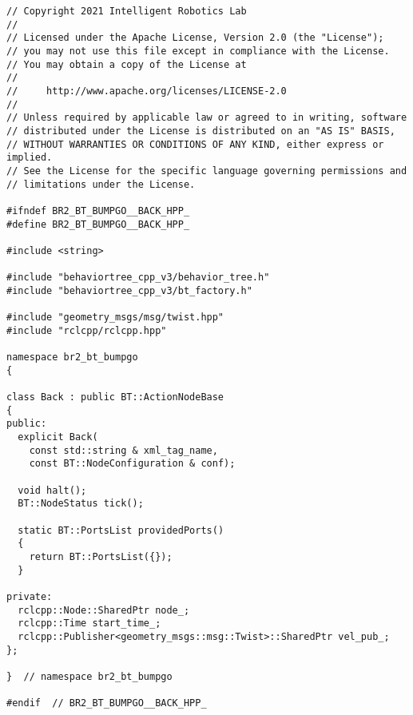  \footnotesize
\begin{tcolorbox}[sharp corners, colframe=gray!80, colback=LightGray, left=0pt, top=0pt, bottom=0pt, title=\texttt{br2\_bt\_bumpgo/include/br2\_bt\_bumpgo/Back.hpp}]
  \begin{verbatim}
// Copyright 2021 Intelligent Robotics Lab
//
// Licensed under the Apache License, Version 2.0 (the "License");
// you may not use this file except in compliance with the License.
// You may obtain a copy of the License at
//
//     http://www.apache.org/licenses/LICENSE-2.0
//
// Unless required by applicable law or agreed to in writing, software
// distributed under the License is distributed on an "AS IS" BASIS,
// WITHOUT WARRANTIES OR CONDITIONS OF ANY KIND, either express or implied.
// See the License for the specific language governing permissions and
// limitations under the License.

#ifndef BR2_BT_BUMPGO__BACK_HPP_
#define BR2_BT_BUMPGO__BACK_HPP_

#include <string>

#include "behaviortree_cpp_v3/behavior_tree.h"
#include "behaviortree_cpp_v3/bt_factory.h"

#include "geometry_msgs/msg/twist.hpp"
#include "rclcpp/rclcpp.hpp"

namespace br2_bt_bumpgo
{

class Back : public BT::ActionNodeBase
{
public:
  explicit Back(
    const std::string & xml_tag_name,
    const BT::NodeConfiguration & conf);

  void halt();
  BT::NodeStatus tick();

  static BT::PortsList providedPorts()
  {
    return BT::PortsList({});
  }

private:
  rclcpp::Node::SharedPtr node_;
  rclcpp::Time start_time_;
  rclcpp::Publisher<geometry_msgs::msg::Twist>::SharedPtr vel_pub_;
};

}  // namespace br2_bt_bumpgo

#endif  // BR2_BT_BUMPGO__BACK_HPP_
    \end{verbatim}
    \end{tcolorbox}
  \normalsize

